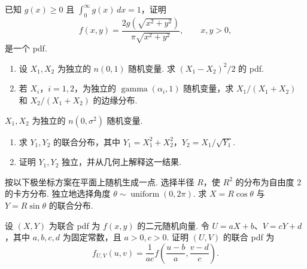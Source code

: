 \begin{exercise}\label{exercise:4.18}
已知 $g(x)\ge0$ 且 $\int_0^\infty g(x)\,dx=1$，证明
$$f(x,y)=\frac{2g(\sqrt{x^2+y^2})}{\pi\sqrt{x^2+y^2}},\qquad x,y>0,$$
是一个 pdf.
\end{exercise}
\begin{exercise}\label{exercise:4.19}\leavevmode
\begin{enumerate}
\item[(a)] 设 $X_1,X_2$ 为独立的 $n(0,1)$ 随机变量. 求 $(X_1-X_2)^2/2$ 的 pdf.
\item[(b)] 若 $X_i$，$i=1,2$，为独立的 $\operatorname{gamma}(\alpha_i,1)$ 随机变量，求 $X_1/(X_1+X_2)$ 和 $X_2/(X_1+X_2)$ 的边缘分布.
\end{enumerate}
\end{exercise}
\begin{exercise}\label{exercise:4.20}
$X_1,X_2$ 为独立的 $n(0,\sigma^2)$ 随机变量.
\begin{enumerate}
\item[(a)] 求 $Y_1,Y_2$ 的联合分布，其中 $Y_1=X_1^2+X_2^2$，$Y_2=X_1/\sqrt{Y_1}$.
\item[(b)] 证明 $Y_1,Y_2$ 独立，并从几何上解释这一结果.
\end{enumerate}
\end{exercise}
\begin{exercise}\label{exercise:4.21}
按以下极坐标方案在平面上随机生成一点. 选择半径 $R$，使 $R^2$ 的分布为自由度 2 的卡方分布. 独立地选择角度 $\theta\sim\operatorname{uniform}(0,2\pi)$. 求 $X=R\cos\theta$ 与 $Y=R\sin\theta$ 的联合分布.
\end{exercise}
\begin{exercise}\label{exercise:4.22}
设 $(X,Y)$ 为联合 pdf 为 $f(x,y)$ 的二元随机向量. 令 $U=aX+b$、$V=cY+d$，其中 $a,b,c,d$ 为固定常数，且 $a>0,c>0$. 证明 $(U,V)$ 的联合 pdf 为
$$f_{U,V}(u,v)=\frac1{ac}f\left(\frac{u-b}a,\frac{v-d}c\right).$$
\end{exercise}

